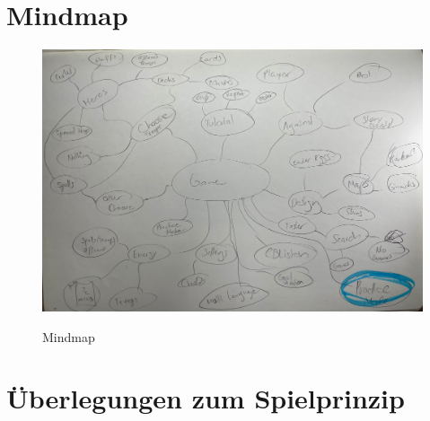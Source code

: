 \section{Mindmap}
    \begin{figure}[H]
        \centering
        \includegraphics[width=14.5cm]{resources/Sk_mindmap1.jpeg}\\
        \caption{Mindmap}
    \end{figure}


\section{Überlegungen zum Spielprinzip}

